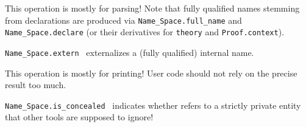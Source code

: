 \begin{isabellebody}
\begin{isamarkuptext}
\begin{description}
  This operation is mostly for parsing!  Note that fully qualified
  names stemming from declarations are produced via \verb|Name_Space.full_name| and \verb|Name_Space.declare|
  (or their derivatives for \verb|theory| and
  \verb|Proof.context|).

  \item \verb|Name_Space.extern|~ externalizes a
  (fully qualified) internal name.

  This operation is mostly for printing!  User code should not rely on
  the precise result too much.

  \item \verb|Name_Space.is_concealed|~ indicates
  whether  refers to a strictly private entity that
  other tools are supposed to ignore!

  \end{description}%
\end{isamarkuptext}%
\isamarkuptrue%
%
\endisatagmlref
{\isafoldmlref}%
%
\isadelimmlref
%
\endisadelimmlref
%
\isadelimtheory
%
\endisadelimtheory
%
\isatagtheory
{}\isamarkupfalse%
%
\endisatagtheory
{\isafoldtheory}%
%
\isadelimtheory
%
\endisadelimtheory
\isanewline
\end{isabellebody}%
